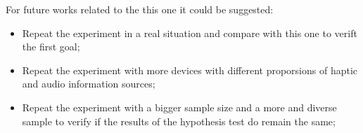 For future works related to the this one it could be suggested:

\begin{itemize}
    \item Repeat the experiment in a real situation and compare with this one to verift the first goal;
    \item Repeat the experiment with more devices with different proporsions of haptic and audio information sources;
    \item Repeat the experiment with a bigger sample size and a more and diverse sample to verify if the results of the hypothesis test do remain the same;
\end{itemize}